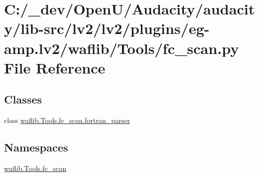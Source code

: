 \hypertarget{lv2_2plugins_2eg-amp_8lv2_2waflib_2_tools_2fc__scan_8py}{}\section{C\+:/\+\_\+dev/\+Open\+U/\+Audacity/audacity/lib-\/src/lv2/lv2/plugins/eg-\/amp.lv2/waflib/\+Tools/fc\+\_\+scan.py File Reference}
\label{lv2_2plugins_2eg-amp_8lv2_2waflib_2_tools_2fc__scan_8py}
\subsection*{Classes}
\begin{DoxyCompactItemize}
\item 
class \hyperlink{classwaflib_1_1_tools_1_1fc__scan_1_1fortran__parser}{waflib.\+Tools.\+fc\+\_\+scan.\+fortran\+\_\+parser}
\end{DoxyCompactItemize}
\subsection*{Namespaces}
\begin{DoxyCompactItemize}
\item 
 \hyperlink{namespacewaflib_1_1_tools_1_1fc__scan}{waflib.\+Tools.\+fc\+\_\+scan}
\end{DoxyCompactItemize}
